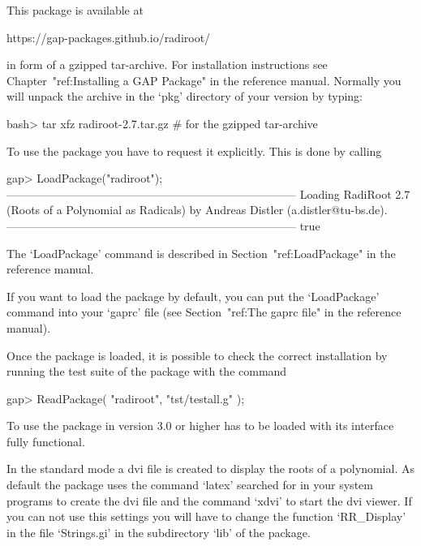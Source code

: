


This package is available at

\begintt
https://gap-packages.github.io/radiroot/
\endtt

in form of a gzipped tar-archive. For installation instructions see
Chapter~"ref:Installing a GAP Package" in the {\GAP} reference manual. 
Normally you will unpack the archive in the `pkg' directory of your
{\GAP} version by typing:

\beginexample
    bash> tar xfz radiroot-2.7.tar.gz        # for the gzipped tar-archive
\endexample


To use the {\Radiroot} package you have to request it explicitly. This  is
done by calling

\beginexample
gap> LoadPackage("radiroot");
-----------------------------------------------------------------------------
Loading  RadiRoot 2.7 (Roots of a Polynomial as Radicals)
by Andreas Distler (a.distler@tu-bs.de).
-----------------------------------------------------------------------------
true
\endexample

The `LoadPackage' command is described  in  Section~"ref:LoadPackage"  in
the {\GAP} reference manual.

If you want to load the {\Radiroot} package by default, you  can  put  the
`LoadPackage' command  into  your  `gaprc'  file  (see  Section~"ref:The
gaprc file" in the {\GAP} reference manual).

Once the package is loaded, it is possible to check the correct
    installation by running the test suite of the package with the command

\beginexample
    gap> ReadPackage( "radiroot", "tst/testall.g" );
\endexample


To use {\Radiroot} the package {\Alnuth} in version 3.0 or higher
has to be loaded with its interface fully functional.

In the standard mode a dvi file is created to display the roots of a
polynomial. As default the package uses the command `latex' searched
for in your system programs to create the dvi file and the command
`xdvi' to start the dvi viewer. If you can not use this settings you
will have to change the function `RR_Display' in the file `Strings.gi'
in the subdirectory `lib' of the package.

